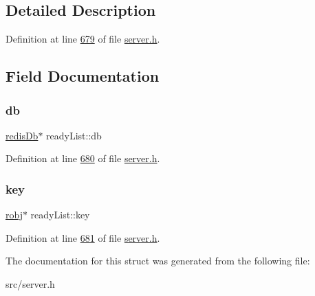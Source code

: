 \subsection{Detailed Description}


Definition at line \hyperlink{server_8h_source_l00679}{679} of file \hyperlink{server_8h_source}{server.\+h}.



\subsection{Field Documentation}
\mbox{\label{structreadyList_a8d62a9f1fc62dd80e2558706860d3244}} 
\subsubsection{\texorpdfstring{db}{db}}
{\footnotesize\ttfamily \hyperlink{structredisDb}{redis\+Db}$\ast$ ready\+List\+::db}



Definition at line \hyperlink{server_8h_source_l00680}{680} of file \hyperlink{server_8h_source}{server.\+h}.

\mbox{\label{structreadyList_aae64208f03c915b39706b8f9837007d2}} 
\subsubsection{\texorpdfstring{key}{key}}
{\footnotesize\ttfamily \hyperlink{structredisObject}{robj}$\ast$ ready\+List\+::key}



Definition at line \hyperlink{server_8h_source_l00681}{681} of file \hyperlink{server_8h_source}{server.\+h}.



The documentation for this struct was generated from the following file\+:\begin{DoxyCompactItemize}
\item 
src/server.\+h\end{DoxyCompactItemize}

